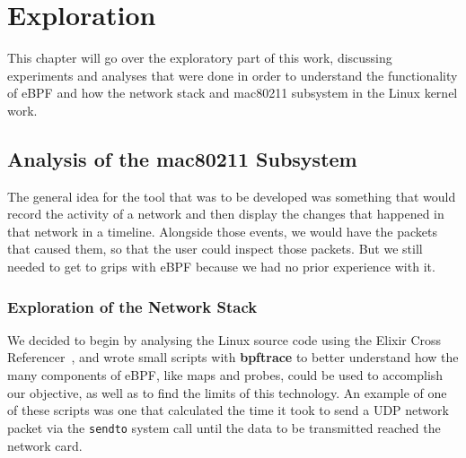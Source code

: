 \chapter{Exploration}\label{chap:expl}

This chapter will go over the exploratory part of this work, discussing
experiments and analyses that were done in order to understand the functionality
of eBPF and how the network stack and mac80211 subsystem in the Linux kernel
work.


\section{Analysis of the mac80211 Subsystem}\label{sect:mac802}

The general idea for the tool that was to be developed was something that would
record the activity of a network and then display the changes that happened in
that network in a timeline. Alongside those events, we would have the packets
that caused them, so that the user could inspect those packets. But we still
needed to get to grips with eBPF because we had no prior experience with it.


\subsection{Exploration of the Network Stack}

We decided to begin by analysing the Linux source code using the Elixir Cross
Referencer~\cite{elixir}, and wrote small scripts with \textbf{bpftrace} to
better understand how the many components of eBPF, like maps and probes, could
be used to accomplish our objective, as well as to find the limits of this
technology. An example of one of these scripts was one that calculated the time
it took to send a \ac{UDP} network packet via the \texttt{sendto} system call
until the data to be transmitted reached the network card.

